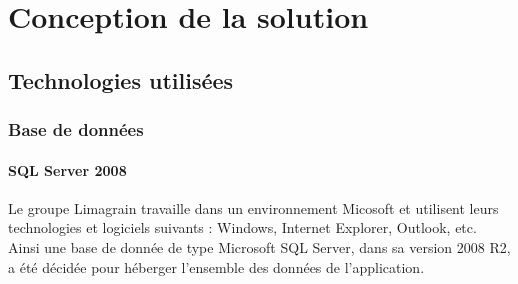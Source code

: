 \cleardoublepage

\chapter{Conception de la solution}


\section{Technologies utilisées}


\subsection{Base de données}


\subsubsection{SQL Server 2008}


Le groupe Limagrain travaille dans un environnement Micosoft et utilisent leurs technologies et logiciels suivants : Windows, Internet Explorer, Outlook, etc.
\\

Ainsi une base de donnée de type Microsoft SQL Server, dans sa version 2008 R2, a été décidée pour héberger l'ensemble des données de l'application.